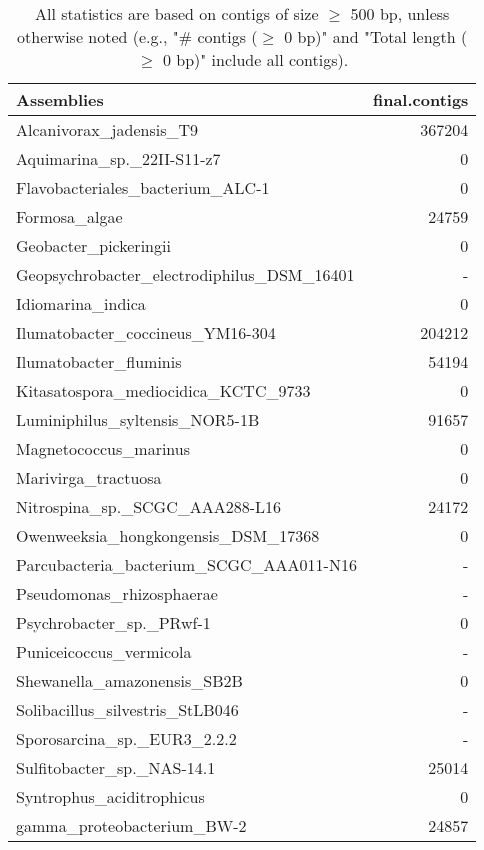 \documentclass[12pt,a4paper]{article}
\begin{document}
\begin{table}[ht]
\begin{center}
\caption{All statistics are based on contigs of size $\geq$ 500 bp, unless otherwise noted (e.g., "\# contigs ($\geq$ 0 bp)" and "Total length ($\geq$ 0 bp)" include all contigs).}
\begin{tabular}{|l*{1}{|r}|}
\hline
Assemblies & final.contigs \\ \hline
Alcanivorax\_jadensis\_T9 & 367204 \\ \hline
Aquimarina\_sp.\_22II-S11-z7 & 0 \\ \hline
Flavobacteriales\_bacterium\_ALC-1 & 0 \\ \hline
Formosa\_algae & 24759 \\ \hline
Geobacter\_pickeringii & 0 \\ \hline
Geopsychrobacter\_electrodiphilus\_DSM\_16401 & - \\ \hline
Idiomarina\_indica & 0 \\ \hline
Ilumatobacter\_coccineus\_YM16-304 & 204212 \\ \hline
Ilumatobacter\_fluminis & 54194 \\ \hline
Kitasatospora\_mediocidica\_KCTC\_9733 & 0 \\ \hline
Luminiphilus\_syltensis\_NOR5-1B & 91657 \\ \hline
Magnetococcus\_marinus & 0 \\ \hline
Marivirga\_tractuosa & 0 \\ \hline
Nitrospina\_sp.\_SCGC\_AAA288-L16 & 24172 \\ \hline
Owenweeksia\_hongkongensis\_DSM\_17368 & 0 \\ \hline
Parcubacteria\_bacterium\_SCGC\_AAA011-N16 & - \\ \hline
Pseudomonas\_rhizosphaerae & - \\ \hline
Psychrobacter\_sp.\_PRwf-1 & 0 \\ \hline
Puniceicoccus\_vermicola & - \\ \hline
Shewanella\_amazonensis\_SB2B & 0 \\ \hline
Solibacillus\_silvestris\_StLB046 & - \\ \hline
Sporosarcina\_sp.\_EUR3\_2.2.2 & - \\ \hline
Sulfitobacter\_sp.\_NAS-14.1 & 25014 \\ \hline
Syntrophus\_aciditrophicus & 0 \\ \hline
gamma\_proteobacterium\_BW-2 & 24857 \\ \hline
\end{tabular}
\end{center}
\end{table}
\end{document}
